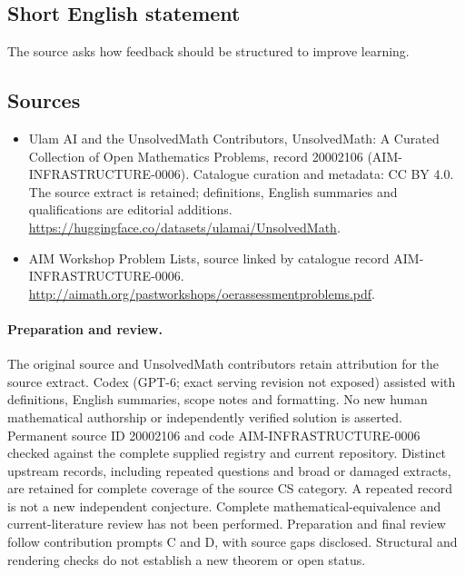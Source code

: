 \documentclass[11pt]{article}
\begin{document}
\subsection{Short English statement}
The source asks how feedback should be structured to improve learning.
\subsection{Sources}
\begin{itemize}
\item[\hypertarget{source:20002106:1}{S1}] Ulam AI and the UnsolvedMath Contributors, UnsolvedMath: A Curated Collection of Open Mathematics Problems, record 20002106 (AIM-INFRASTRUCTURE-0006). Catalogue curation and metadata: CC BY 4.0. The source extract is retained; definitions, English summaries and qualifications are editorial additions.
\url{https://huggingface.co/datasets/ulamai/UnsolvedMath}.
\item[\hypertarget{source:20002106:2}{S2}] AIM Workshop Problem Lists, source linked by catalogue record AIM-INFRASTRUCTURE-0006.
\url{http://aimath.org/pastworkshops/oerassessmentproblems.pdf}.
\end{itemize}
\paragraph{Preparation and review.}
The original source and UnsolvedMath contributors retain attribution for the source extract. Codex (GPT-6; exact serving revision not exposed) assisted with definitions, English summaries, scope notes and formatting. No new human mathematical authorship or independently verified solution is asserted. Permanent source ID 20002106 and code AIM-INFRASTRUCTURE-0006 checked against the complete supplied registry and current repository. Distinct upstream records, including repeated questions and broad or damaged extracts, are retained for complete coverage of the source CS category. A repeated record is not a new independent conjecture. Complete mathematical-equivalence and current-literature review has not been performed. Preparation and final review follow contribution prompts C and D, with source gaps disclosed. Structural and rendering checks do not establish a new theorem or open status.
\label{end:20002106}
\end{document}

